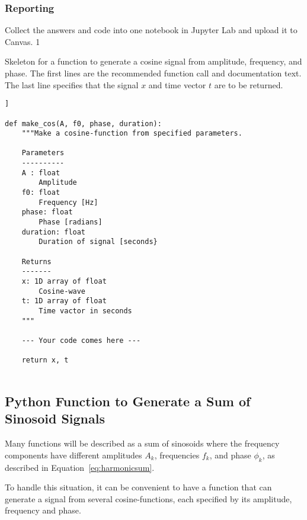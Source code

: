 \subsubsection*{Reporting}	
Collect the answers and code into one notebook in Jupyter Lab and upload it to Canvas.
1
\begin{table}[h!]
	\caption{Skeleton for a function to generate a cosine signal from amplitude, frequency, and phase.
	The first lines are the recommended function call and documentation text. The last line specifies that the signal $x$ and time vector $t$ are to be returned. }
	\label{tab:make-cos}
\begin{lstlisting}[style=pythonstyle]]

def make_cos(A, f0, phase, duration):
	"""Make a cosine-function from specified parameters.
	
	Parameters
	----------
	A : float
		Amplitude
	f0: float
		Frequency [Hz]
	phase: float
		Phase [radians]
	duration: float
		Duration of signal [seconds}
	
	Returns
	-------
	x: 1D array of float
		Cosine-wave
	t: 1D array of float
		Time vactor in seconds
	"""
	
	--- Your code comes here ---
	
	return x, t
		
\end{lstlisting}
\end{table}

\subsection{Python Function to Generate a Sum of Sinosoid Signals}
Many functions will be described as a sum of sinosoids where the frequency components have different amplitudes $A_k$, frequencies $f_k$, and phase $\phi_k$, as described in Equation~\eqref{eq:harmonicsum}.

To handle this situation, it can be convenient to have a function that can generate a signal from several cosine-functions, each specified by its amplitude, frequency and phase.

